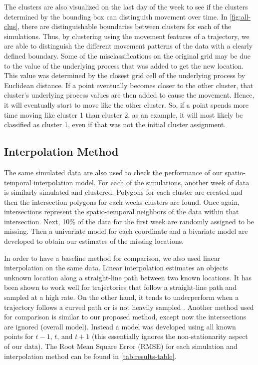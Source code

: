 \documentclass[12pt]{article}
\begin{document}
The clusters are also visualized on the last day of the week to see if
the clusters determined by the bounding box can distinguish movement
over time. In \cref{fig:all-clus}, there are distinguishable boundaries
between clusters for each of the simulations. Thus, by clustering using
the movement features of a trajectory, we are able to distinguish the
different movement patterns of the data with a clearly defined boundary.
Some of the misclassifications on the original grid may be due to the
value of the underlying process that was added to get the new location.
This value was determined by the closest grid cell of the underlying
process by Euclidean distance. If a point eventually becomes closer to
the other cluster, that cluster's underlying process values are then
added to cause the movement. Hence, it will eventually start to move
like the other cluster. So, if a point spends more time moving like
cluster 1 than cluster 2, as an example, it will most likely be
classified as cluster 1, even if that was not the initial cluster
assignment.

\hypertarget{interpolation-method}{%
\subsection{Interpolation Method}\label{interpolation-method}}

The same simulated data are also used to check the performance of our
spatio-temporal interpolation model. For each of the simulations,
another week of data is similarly simulated and clustered. Polygons for
each cluster are created and then the intersection polygons for each
weeks clusters are found. Once again, intersections represent the
spatio-temporal neighbors of the data within that intersection. Next,
10\% of the data for the first week are randomly assigned to be missing.
Then a univariate model for each coordinate and a bivariate model are
developed to obtain our estimates of the missing locations.

In order to have a baseline method for comparison, we also used linear
interpolation on the same data. Linear interpolation estimates an
objects unknown location along a straight-line path between two known
locations. It has been shown to work well for trajectories that follow a
straight-line path and sampled at a high rate. On the other hand, it
tends to underperform when a trajectory follows a curved path or is not
heavily sampled \citep{wentz_comparison_2003, guo_improved_2021}.
Another method used for comparison is similar to our proposed method,
except now the intersections are ignored (overall model). Instead a
model was developed using all known points for \(t-1\), \(t\), and
\(t+1\) (this essentially ignores the non-stationarity aspect of our
data). The Root Mean Square Error (RMSE) for each simulation and
interpolation method can be found in \cref{tab:results-table}.
\end{document}
